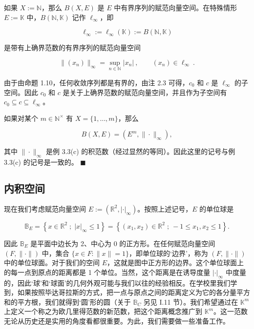 \begin{remark}

\begin{items}
\item

如果 $ X := \mathbb{N} $，那么 $ B(X, E) $ 是 $ E $ 中有界序列的赋范向量空间。在特殊情形 $ E := \mathbb{K} $ 中，$ B(\mathbb{N}, \mathbb{K}) $ 记作 $ \ell_\infty $，即

\[
\ell_{\infty}:=\ell_{\infty}(\mathbb{K}):=B(\mathbb{N},\mathbb{K})
\]

是带有上确界范数的有界序列的赋范向量空间

\[
\|(x_{n})\|_{\infty}=\operatorname*{s u p}_{n\in\mathbb{N}}|x_{n}|~,\qquad(x_{n})\in\ell_{\infty}~.
\]
\item

由于由命题 1.10，任何收敛序列都是有界的，由注 2.3 可得，$c_0$ 和 $c$ 是 $\ell_\infty$ 的子空间。因此 $c_0$ 和 $c$ 是关于上确界范数的赋范向量空间，并且作为子空间有 $c_0 \subseteq c \subseteq \ell_\infty$。

\item

如果对某个 $ m \in \mathbb{N}^\times $ 有 $ X = \{1, \ldots, m\} $，那么

\[
B(X,E)=(E^{m},\|\cdot\|_\infty),
\]

其中 $ \|\cdot\|_\infty $ 是例 3.3(c) 的积范数（经过显然的等同）。因此这里的记号与例 3.3(c) 的记号是一致的。 $ \blacksquare $

\end{items}

\end{remark}

\subsection*{内积空间}

现在我们考虑赋范向量空间 $ E := (\mathbb{R}^2, |\cdot|_{\infty}) $。按照上述记号，$ E $ 的单位球是

\[
\mathbb{B}_{E}=\left\{x\in\mathbb{R}^{2}\;;\;|x|_{\infty}\leq1\right\}=\left\{\left(x_{1},x_{2}\right)\in\mathbb{R}^{2}\;;\ -1\leq x_{1},x_{2}\leq1\right\}.
\]

因此 $ \mathbb{B}_E $ 是平面中边长为 2、中心为 0 的正方形。在任何赋范向量空间 $ (F, \|\cdot\|) $ 中，集合 $ \{x \in F : \|x\| = 1\} $，即单位球的‘边界’，称为 $ (F, \|\cdot\|) $ 中的单位球面。对于我们的空间 $ E $，这就是图中正方形的边界。这个单位球面上的每一点到原点的距离都是 1 个单位。当然，这个距离是在诱导度量 $ |\cdot|_{\infty} $ 中度量的，因此‘球’和‘球面’的几何外观可能与我们以往的经验相反。在学校里我们学到，如果按照毕达哥拉斯的方式，把一点与原点之间的距离定义为它的各分量平方和的平方根，我们就得到‘圆’形的圆（关于 $ \mathbb{B}_C $ 另见 I.11 节）。我们希望通过在 $ \mathbb{K}^m $ 上定义一个称之为欧几里得范数的新范数，把这个距离概念推广到 $ \mathbb{K}^m $。这一范数无论从历史还是实用的角度看都很重要。为此，我们需要做一些准备工作。

